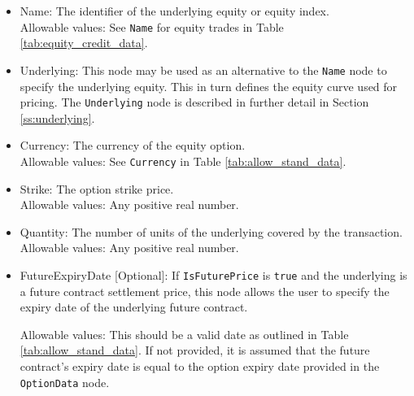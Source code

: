 \begin{itemize}
	\item Name: The identifier of the underlying equity or equity index. \\
	Allowable values:  See \lstinline!Name! for equity trades in Table \ref{tab:equity_credit_data}. \\
	\item Underlying:  This node may be used as an alternative to the \lstinline!Name! node to specify the underlying equity. This in turn defines the equity curve used for pricing. The \lstinline!Underlying! node is described in further detail in Section \ref{ss:underlying}. \\
	\item Currency: The currency of the equity option. \\
	Allowable values:  See \lstinline!Currency! in Table \ref{tab:allow_stand_data}.	
	\item Strike: The option strike price.\\
	Allowable values:  Any positive real number.	
	\item Quantity: The number of units of the underlying covered by the transaction. \\
	Allowable values:  Any positive real number.
    \item FutureExpiryDate [Optional]: If \lstinline!IsFuturePrice! is \lstinline!true! and the underlying is a future contract settlement price, this node allows the user to specify the expiry date of the underlying future contract.

    Allowable values: This should be a valid date as outlined in Table \ref{tab:allow_stand_data}. If not provided, it is assumed that the future contract's expiry date is equal to the option expiry date provided in the \lstinline!OptionData! node.
\end{itemize}
